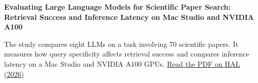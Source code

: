 
\begin{cvparagraph}
\noindent\textbf{Evaluating Large Language Models for Scientific Paper Search: Retrieval Success and Inference Latency on Mac Studio and NVIDIA A100}\par
\vspace{1.5pt}
\noindent The study compares eight LLMs on a task involving 70 scientific papers. It measures how query specificity affects retrieval success and compares inference latency on a Mac Studio and NVIDIA A100 GPUs.
\enspace\href{https://hal.science/hal-05862398/document}{\underline{Read the PDF on HAL (2026)}}
\end{cvparagraph}
